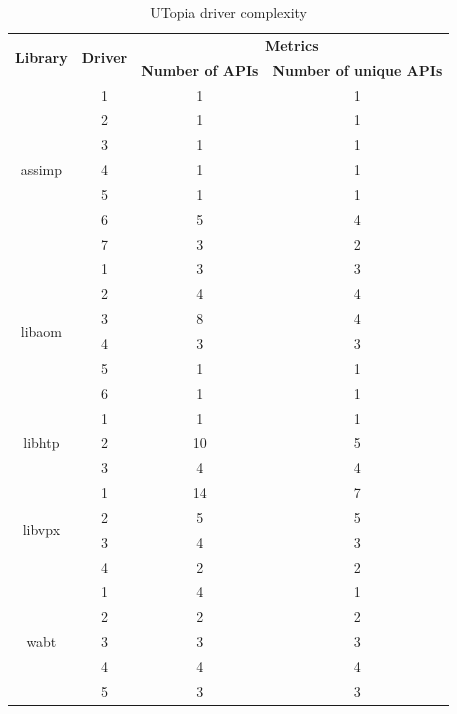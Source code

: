 \documentclass[a4paper,11pt,oneside]{report}
\begin{document}
\begin{table}[h]
  \centering
  \caption{UTopia driver complexity}
  \label{tab:drivers_apis_utopia}

  \begin{tabular}{|c|c|c|c|}
    \hline
    \multirow{2}{*}{\textbf{Library}} & \multirow{2}{*}{\textbf{Driver}} & \multicolumn{2}{c|}{\textbf{Metrics}} \\
    \cline{3-4}
     &  & \textbf{Number of APIs} & \textbf{Number of unique APIs} \\
    \hline
    \multirow{7}{*}{assimp} & 1 & 1 & 1 \\
     & 2 & 1 & 1   \\
     & 3 & 1 & 1   \\
     & 4 & 1 & 1  \\
     & 5 & 1 & 1   \\
     & 6 & 5 & 4   \\
     & 7 & 3 & 2   \\
    \hline
    \multirow{6}{*}{libaom} & 1 & 3 & 3 \\
     & 2 & 4 & 4  \\
     & 3 & 8 & 4  \\
     & 4 & 3 & 3  \\
     & 5 & 1 & 1  \\
     & 6 & 1 & 1 \\
    \hline
    \multirow{3}{*}{libhtp} & 1 & 1 & 1 \\
     & 2 & 10 & 5  \\
     & 3 & 4 & 4 \\
    \hline
    \multirow{4}{*}{libvpx} & 1 & 14 & 7 \\
     & 2 & 5 & 5  \\
     & 3 & 4 & 3  \\
     & 4 & 2 & 2 \\
    \hline
    \multirow{5}{*}{wabt} & 1 & 4 & 1 \\
     & 2 & 2 & 2  \\
     & 3 & 3 & 3  \\
     & 4 & 4 & 4  \\
     & 5 & 3 & 3 \\
    \hline
  \end{tabular}
\end{table}
\end{document}
